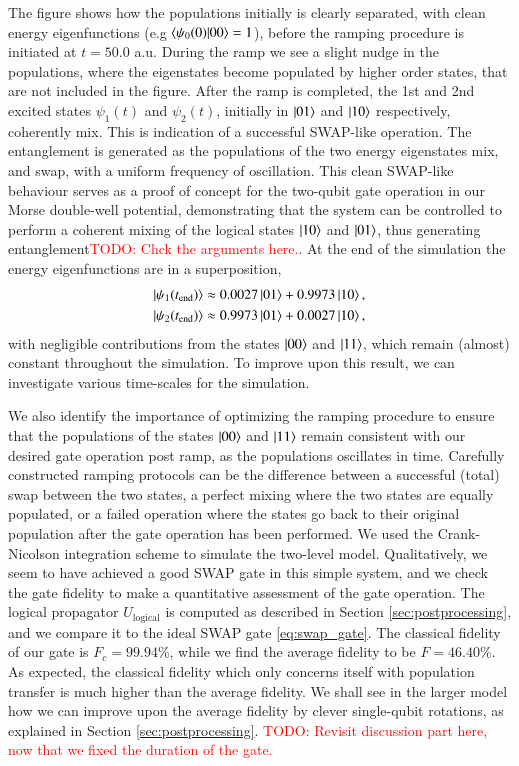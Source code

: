 \documentclass{subfiles}
\begin{document}
The figure shows how the populations initially is clearly separated, with clean energy eigenfunctions (e.g $\braket{\psi_0(0)|00} = 1$), before the ramping procedure is initiated at $t = 50.0$ a.u. During the ramp we see a slight nudge in the populations, where the eigenstates become populated by higher order states, that are not included in the figure. After the ramp is completed, the 1st and 2nd excited states $\psi_1(t)$ and $\psi_2(t)$, initially in $\ket{01}$ and $\ket{10}$ respectively, coherently mix. This is indication of a successful SWAP-like operation. The entanglement is generated as the populations of the two energy eigenstates mix, and swap, with a uniform frequency of oscillation. This clean SWAP-like behaviour serves as a proof of concept for the two-qubit gate operation in our Morse double-well potential, demonstrating that the system can be controlled to perform a coherent mixing of the logical states $\ket{10}$ and $\ket{01}$, thus generating entanglement\textcolor{red}{TODO: Chck the arguments here.}. At the end of the simulation the energy eigenfunctions are in a superposition, 
\begin{align*}
    \ket{\psi_1(t_{\text{end}})} &\approx 0.0027 \ket{01} + 0.9973 \ket{10}, \\
    \ket{\psi_2(t_{\text{end}})} &\approx 0.9973 \ket{01} + 0.0027 \ket{10},
\end{align*}
with negligible contributions from the states $\ket{00}$ and $\ket{11}$, which remain (almost) constant throughout the simulation. To improve upon this result, we can investigate various time-scales for the simulation.

We also identify the importance of optimizing the ramping procedure to ensure that the populations of the states $\ket{00}$ and $\ket{11}$ remain consistent with our desired gate operation post ramp, as the populations oscillates in time. Carefully constructed ramping protocols can be the difference between a successful (total) swap between the two states, a perfect mixing where the two states are equally populated, or a failed operation where the states go back to their original population after the gate operation has been performed. We used the Crank-Nicolson integration scheme to simulate the two-level model. Qualitatively, we seem to have achieved a good SWAP gate in this simple system, and we check the gate fidelity to make a quantitative assessment of the gate operation. The logical propagator $U_{\text{logical}}$ is computed as described in Section \ref{sec:postprocessing}, and we compare it to the ideal SWAP gate \eqref{eq:swap_gate}. The classical fidelity of our gate is $F_c = 99.94\%$, while we find the average fidelity to be $F = 46.40\%$. As expected, the classical fidelity which only concerns itself with population transfer is much higher than the average fidelity. We shall see in the larger model how we can improve upon the average fidelity by clever single-qubit rotations, as explained in Section \ref{sec:postprocessing}.
\textcolor{red}{TODO: Revisit discussion part here, now that we fixed the duration of the gate.}
\end{document}
